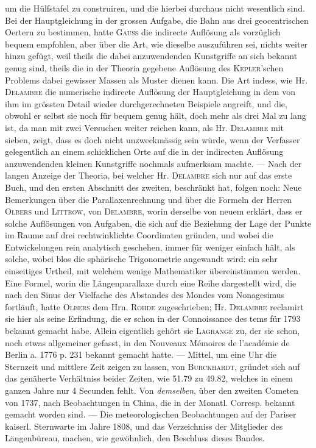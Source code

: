um die Hülfstafel zu construiren, und die hierbei durchaus nicht wesentlich sind. Bei der Hauptgleichung in der grossen Aufgabe, die Bahn aus drei geocentrischen Oertern zu bestimmen, hatte \textsc{Gauss} die indirecte Auflösung als vorzüglich bequem empfohlen, aber über die Art, wie dieselbe auszuführen sei, nichts weiter hinzu gefügt, weil theils die dabei anzuwendenden Kunstgriffe an sich bekannt genug sind, theils die in der Theoria gegebene Auflösung des \textsc{Kepler}'schen Problems dabei gewisser Massen als Muster dienen kann. Die Art indess, wie Hr. \textsc{Delambre} die numerische indirecte Auflösung der Hauptgleichung in dem von ihm im grössten Detail wieder durchgerechneten Beispiele angreift, und die, obwohl er selbst sie noch für bequem genug hält, doch mehr als drei Mal zu lang ist, da man mit zwei Versuchen weiter reichen kann, als Hr. \textsc{Delambre} mit sieben, zeigt, dass es doch nicht unzweckmässig sein würde, wenn der Verfasser gelegentlich an einem schicklichen Orte auf die in der indirecten Auflösung anzuwendenden kleinen Kunstgriffe nochmals aufmerksam machte. --- Nach der langen Anzeige der Theoria, bei welcher Hr. \textsc{Delambre} sich nur auf das erste Buch, und den ersten Abschnitt des zweiten, beschränkt hat, folgen noch: Neue Bemerkungen über die Parallaxenrechnung und über die Formeln der Herren \textsc{Olbers} und \textsc{Littrow}, von \textsc{Delambre}, worin derselbe von neuem erklärt, dass er solche Auflösungen von Aufgaben, die sich auf die Beziehung der Lage der Punkte im Raume auf drei rechtwinklichte Coordinaten gründen, und wobei die Entwickelungen rein analytisch geschehen, immer für weniger einfach hält, als solche, wobei blos die sphärische Trigonometrie angewandt wird: ein sehr einseitiges Urtheil, mit welchem wenige Mathematiker übereinstimmen werden. Eine Formel, worin die Längenparallaxe durch eine Reihe dargestellt wird, die nach den Sinus der Vielfache des Abstandes des Mondes vom Nonagesimus fortläuft, hatte \textsc{Olbers} dem Hrn. \textsc{Rohde} zugeschrieben; Hr. \textsc{Delambre} reclamirt sie hier als seine Erfindung, die er schon in der Connoissance des tems für 1793 bekannt gemacht habe. Allein eigentlich gehört sie \textsc{Lagrange} zu, der sie schon, noch etwas allgemeiner gefasst, in den Nouveaux Mémoires de l'académie de Berlin a. 1776 p. 231 bekannt gemacht hatte. --- Mittel, um eine Uhr die Sternzeit und mittlere Zeit zeigen zu lassen, von \textsc{Burckhardt}, gründet sich auf das genäherte Verhältniss beider Zeiten, wie 51.79 zu 49.82, welches in einem ganzen Jahre nur 4 Secunden fehlt. Von \emph{demselben}, über den zweiten Cometen von 1737, nach Beobachtungen in China, die in der Monatl. Corresp. bekannt gemacht worden sind. --- Die meteorologischen Beobachtungen auf der Pariser kaiserl. Sternwarte im Jahre 1808, und das Verzeichniss der Mitglieder des Längenbüreau, machen, wie gewöhnlich, den Beschluss dieses Bandes.
